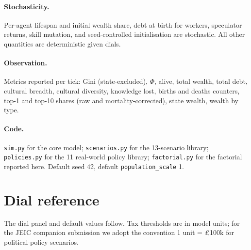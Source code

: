 \documentclass[11pt]{article}
\begin{document}
\paragraph{Stochasticity.}  Per-agent lifespan and initial wealth
share, debt at birth for workers, speculator returns, skill
mutation, and seed-controlled initialisation are stochastic.  All
other quantities are deterministic given dials.

\paragraph{Observation.}  Metrics reported per tick: Gini
(state-excluded), $\Phi$, alive, total wealth, total debt, cultural
breadth, cultural diversity, knowledge lost, births and deaths
counters, top-1 and top-10 shares (raw and mortality-corrected),
state wealth, wealth by type.

\paragraph{Code.}  \texttt{sim.py} for the core model;
\texttt{scenarios.py} for the 13-scenario library;
\texttt{policies.py} for the 11 real-world policy library;
\texttt{factorial.py} for the factorial reported here.  Default
seed 42, default \texttt{population\_scale} 1.

\section{Dial reference}
\label{app:dials}

The dial panel and default values follow.  Tax thresholds are in
model units; for the JEIC companion submission we adopt the
convention 1 unit = \pounds 100k for political-policy scenarios.
\end{document}
